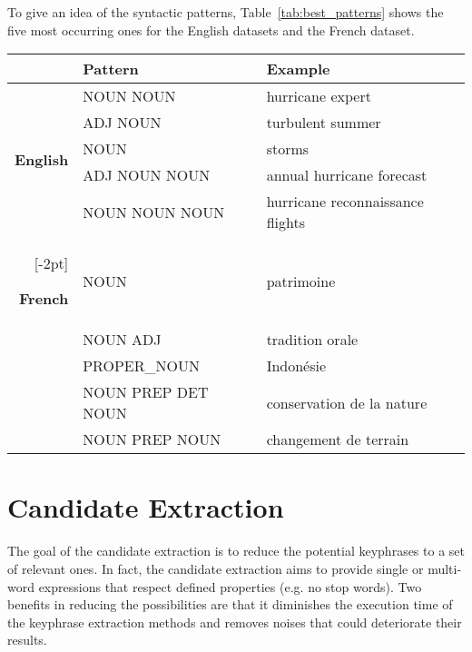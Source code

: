     To give an idea of the syntactic patterns, Table~\ref{tab:best_patterns}
    shows the five most occurring ones for the English datasets and the French
    dataset.
    \begin{table*}
      \centering
      \begin{tabular}{rll}
        \toprule
        & \textbf{Pattern} & \textbf{Example}\\
        \midrule
        \multirow{5}{*}[-2pt]{\begin{sideways}\textbf{English}\end{sideways}} & NOUN NOUN & hurricane expert\\ %
        & ADJ NOUN & turbulent summer\\ %
        & NOUN & storms\\ %
        & ADJ NOUN NOUN & annual hurricane forecast\\ %
        & NOUN NOUN NOUN & hurricane reconnaissance flights\\ %
        \addlinespace[1.5\defaultaddspace]
        \multirow{5}{*}[-2pt]{\begin{sideways}\textbf{French}\end{sideways}} & NOUN & patrimoine\\ %
        & NOUN ADJ & tradition orale\\ %
        & PROPER\_NOUN & Indonésie\\ %
        & NOUN PREP DET NOUN & conservation de la nature\\ %
        & NOUN PREP NOUN & changement de terrain\\ %
        \bottomrule
      \end{tabular}
      \caption{Frequent part-of-speech patterns for English and French
               keyphrases. \label{tab:best_patterns}}
    \end{table*}

\section{Candidate Extraction}
\label{sec:candidate_extraction}
  The goal of the candidate extraction is to reduce the potential keyphrases to
  a set of relevant ones. In fact, the candidate extraction aims to provide
  single or multi-word expressions that respect defined properties (e.g. no stop
  words). Two benefits in reducing the possibilities are that it diminishes the
  execution time of the keyphrase extraction methods and removes noises that
  could deteriorate their results.

